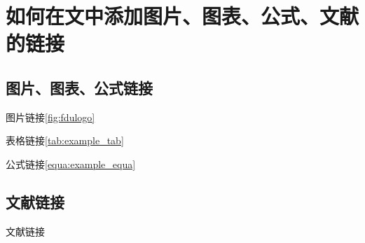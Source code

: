 \chapter{如何在文中添加图片、图表、公式、文献的链接}\label{chap5}


\section{图片、图表、公式链接}

图片链接\ref{fig:fdulogo}

表格链接\ref{tab:example_tab}

公式链接\ref{equa:example_equa}

\section{文献链接}

文献链接\cite{fastmask}
